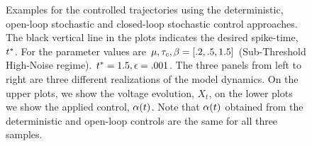 \documentclass{article}
\begin{document}
\begin{figure}[h]
\begin{center}
\caption[]{Examples for the controlled trajectories using the
deterministic, open-loop stochastic and closed-loop stochastic control
approaches. The black vertical line in the plots indicates the desired spike-time, ${ t^* }$.
For the parameter values are ${\mu }, { \tau_{c} }, {\beta} = [.2, .5,  1.5]$ (Sub-Threshold
High-Noise regime). ${ t^* } = 1.5, {\epsilon} = .001$. The three panels from left to
right are three different realizations of the model dynamics. On the upper
plots, we show the voltage evolution, $X_t$, on the lower plots we show the
applied control, ${\alpha}(t)$. Note that ${\alpha}(t)$ obtained from the
deterministic and open-loop controls are the same for all three samples.}
\label{fig:control_trajectories_examples} 
\end{center}
\end{figure}  
\end{document}
